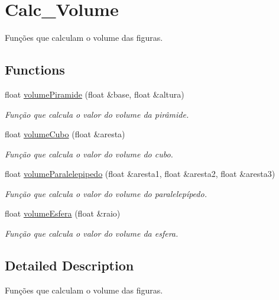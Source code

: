 \hypertarget{group__Calc__Volume}{}\section{Calc\+\_\+\+Volume}
\label{group__Calc__Volume}


Funções que calculam o volume das figuras.  


\subsection*{Functions}
\begin{DoxyCompactItemize}
\item 
float \hyperlink{group__Calc__Volume_ga4a36098bad980501fa8e5d0229309098}{volume\+Piramide} (float \&base, float \&altura)
\begin{DoxyCompactList}\small\item\em Função que calcula o valor do volume da pirâmide. \end{DoxyCompactList}\item 
float \hyperlink{group__Calc__Volume_ga43aaef1a010e2ccbe7e5389aa5be3366}{volume\+Cubo} (float \&aresta)
\begin{DoxyCompactList}\small\item\em Função que calcula o valor do volume do cubo. \end{DoxyCompactList}\item 
float \hyperlink{group__Calc__Volume_gadf67b3277ecfcf3e6e225e1f66e30a23}{volume\+Paralelepipedo} (float \&aresta1, float \&aresta2, float \&aresta3)
\begin{DoxyCompactList}\small\item\em Função que calcula o valor do volume do paralelepípedo. \end{DoxyCompactList}\item 
float \hyperlink{group__Calc__Volume_gaf649387c42d43094c7c81e2f26face42}{volume\+Esfera} (float \&raio)
\begin{DoxyCompactList}\small\item\em Função que calcula o valor do volume da esfera. \end{DoxyCompactList}\end{DoxyCompactItemize}


\subsection{Detailed Description}
Funções que calculam o volume das figuras. 



